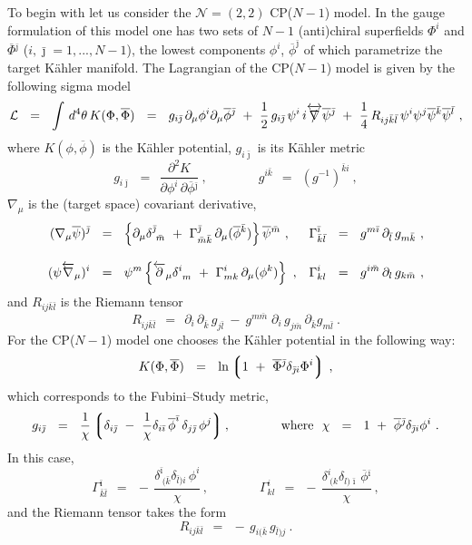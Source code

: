 \documentclass[12pt]{article}
\newcommand{\ntwot}{${\mathcal N}= \left(2,2\right) $ }
\newcommand{\p}{\partial}
\newcommand{\ov}{\overline}
\newcommand{\mc}[1]{\mathcal{#1}}
\newcommand{\lgr}{\left\lgroup}
\newcommand{\rgr}{\right\rgroup}
\def\slashed#1{\setbox0=\hbox{$#1$}             %
   \dimen0=\wd0                                 %
   \setbox1=\hbox{/} \dimen1=\wd1               %
   \ifdim\dimen0>\dimen1                        %
      \rlap{\hbox to \dimen0{\hfil/\hfil}}      %
      #1                                        %
   \else                                        %
      \rlap{\hbox to \dimen1{\hfil$#1$\hfil}}   %
      /                                         %
   \fi}                                        %
\newcommand{\bi}{{\bar \imath}}
\newcommand{\bj}{{\bar \jmath}}
\newcommand{\bk}{{\bar k}}
\newcommand{\bl}{{\bar l}}
\newcommand{\bm}{{\bar m}}
\begin{document}
To begin with let us consider the \ntwot CP($N-1$) model.
In the gauge formulation of this model one has two sets of $ N - 1 $ (anti)chiral 
	superfields $ \Phi^i $ and $ \ov{\Phi}{}^\bj $ ($ i, \bj = 1,..., N-1 $), 
	the lowest components $ \phi^i $, $ \ov{\phi}^\bj $ of which parametrize the target K\"{a}hler
	manifold.
The Lagrangian of the CP($N-1$) model is given by the following sigma model
\[
	\mc{L} ~~=~~ \int\, d^4\theta\, K(\Phi,\ov{\Phi}) ~~=~~ g_{i\bj}\,\p_\mu \phi^i \p_\mu\ov{\phi}{}^\bj
		~+~ \frac{1}{2}\, g_{i\bj}\, \psi^i\, i\overleftrightarrow{\slashed{\nabla}} \ov{\psi}{}^\bj 
		~+~ \frac{1}{4}\, R_{ij\bk\bl}\, \psi^i\psi^j \ov{\psi}{}^\bk \ov{\psi}{}^\bl~,
\]
	where $ K(\phi,\ov{\phi}) $ is the K\"ahler potential, 
	$ g_{i\bj} $ is its K\"ahler metric
\[
	g_{i\bj} ~~=~~ \frac{\p^2 K}{\p\phi^i\,{\p\ov{\phi}{}^\bj}}~,
	\qquad\qquad
	g^{i\bk} ~~=~~ \left(g^{-1}\right)^{\bk i}~,
\]
	$ \nabla_\mu $ is  the (target space) covariant derivative,
\begin{align}
% 
\notag
	(\nabla_\mu \ov{\psi})^\bj & ~~=~~ \left\{ \p_\mu \delta^\bj_{\ \bm} ~+~
						\Gamma_{\bm\bk}^\bj\, \p_\mu(\ov{\phi}{}^\bk) \right\} \ov{\psi}{}^\bm~,
	& \Gamma^\bi_{\bk\bl} & ~~=~~ g^{m\bi}\,\p_\bl\, g_{m\bk}~,
	\\[3mm]
%
\label{covd}
	(\psi \overleftarrow{\nabla}{}_\mu)^i & ~~=~~ 
			\psi^m \left\{ \overleftarrow{\p}{}_\mu\delta^i_{\ m} ~+~
						\Gamma^i_{mk}\, \p_\mu(\phi^k) \right\}~,
	& \Gamma^i_{kl} & ~~=~~ g^{i\bm}\, \p_l\, g_{k\bm}~,
\end{align}
	and $ R_{ij\bk\bl} $ is the Riemann tensor 
\[
	R_{ij\bk\bl} ~~=~~ \p_i\,\p_\bk\, g_{j\bl} ~-~ g^{m\bm}\; \p_i\, g_{j\bm}\, \p_\bk g_{m\bl}~.
\]
	For the CP($N-1$) model one chooses the K\"ahler potential in the following way:
\[
	K(\Phi, \ov{\Phi}) ~~=~~ \ln \lgr 1 ~+~ \ov{\Phi}{}^\bj \delta_{\bj i} \Phi^i \rgr \,,
\]
	which corresponds to the Fubini--Study metric,
\[
	g_{i\bj} ~~=~~ \frac{1}{\chi}\lgr  \delta_{i\bj} ~-~ \frac{1}{\chi}
				  \delta_{i\bi}\,\ov{\phi}^\bi\, \delta_{j\bj}\,\phi^j \rgr,
	\qquad\qquad \text{where~~}
	\chi ~~=~~ 1 ~+~ \ov{\phi}{}^\bj \delta_{\bj i} \phi^i~.
\]
	In this case,
\[
	\Gamma^\bi_{\bk\bl} ~~=~~ -\, \frac{\delta^\bi_{\ (\bk} \delta_{\bl) i}\, \phi^i}{\chi}\,,  
	\qquad\qquad 
	\Gamma^i_{kl} ~~=~~ -\, \frac{\delta^i_{\ (k} \delta_{l)\bi}\,\ov{\phi}{}^\bi}{\chi}\,,
\]
	and the Riemann tensor takes the form
\[
	R_{ij\bk\bl} ~~=~~ -\,g_{i(\bk}\,g_{\bl)j}~.
\]
	
\end{document}
